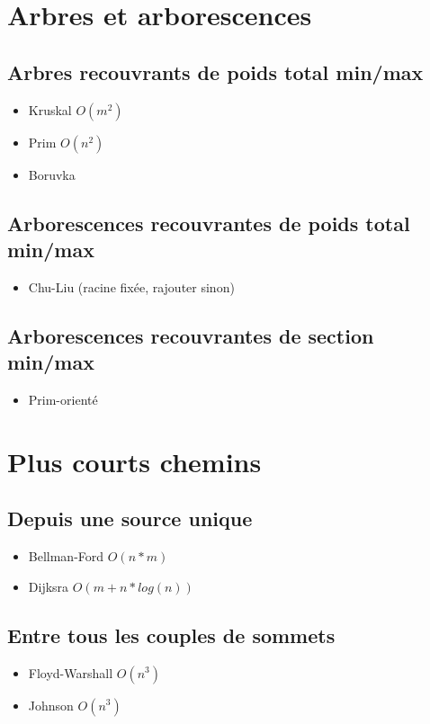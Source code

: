 \documentclass[french]{article}
\begin{document}
	\section{Arbres et arborescences}
		\subsection{Arbres recouvrants de poids total min/max}
		\begin{itemize}
			\item Kruskal $O(m^2)$
			\item Prim $O(n^2)$
			\item Boruvka
		\end{itemize}
		\subsection{Arborescences recouvrantes de poids total min/max}
		\begin{itemize}
			\item Chu-Liu (racine fixée, rajouter sinon)
		\end{itemize}
		\subsection{Arborescences recouvrantes de section min/max}
		\begin{itemize}
			\item Prim-orienté
		\end{itemize}
	
	\section{Plus courts chemins}
		\subsection{Depuis une source unique}
		\begin{itemize}
			\item Bellman-Ford $O(n*m)$
			\item Dijksra $O(m + n*log(n))$
		\end{itemize}
		\subsection{Entre tous les couples de sommets}
		\begin{itemize}
			\item Floyd-Warshall $O(n^3)$
			\item Johnson $O(n^3)$
		\end{itemize}
\end{document}

